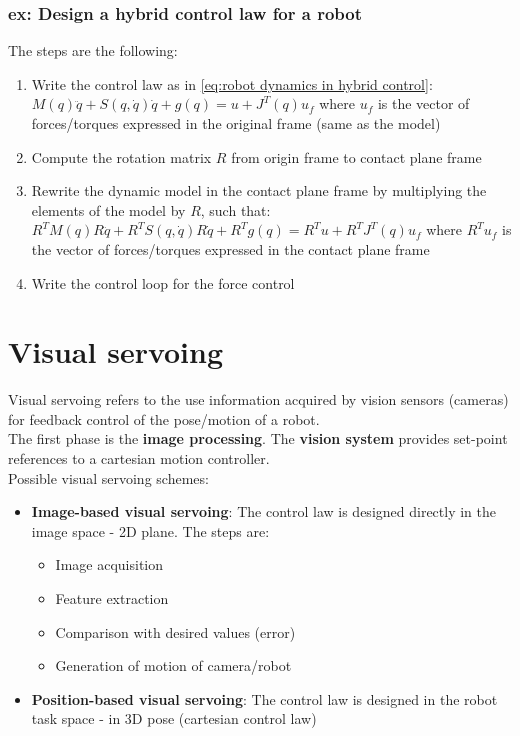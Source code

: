 \documentclass[a4paper,12pt]{article}
\begin{document}
\subsubsection{ex: Design a hybrid control law for a robot}
The steps are the following:
\begin{enumerate}
    \item Write the control law as in \ref{eq:robot dynamics in hybrid control}:
    $M(q)\ddot{q}+S(q,\dot{q})\dot{q}+g(q)=u+J^T(q)u_f$
    where $u_f$ is the vector of forces/torques expressed 
    in the original frame (same as the model)
    \item Compute the rotation matrix $R$ from origin frame to contact plane frame 
    \item Rewrite the dynamic model in the contact plane frame
    by multiplying the elements of the model by $R$, such that:
    $R^TM(q)R\ddot{q}+R^TS(q,\dot{q})R\dot{q}+R^Tg(q)=R^Tu + R^TJ^T(q)u_f$
    where $R^T u_f$ is the vector of forces/torques expressed in the contact plane frame
    \item Write the control loop for the force control
\end{enumerate}





\section{Visual servoing}
Visual servoing refers to the
use information acquired by vision sensors (cameras)
for feedback control of the pose/motion of a robot.\\
The first phase is the \textbf{image processing}.
The \textbf{vision system} provides set-point references to a cartesian 
motion controller.\\
Possible visual servoing schemes:
\begin{itemize}
    \item \textbf{Image-based visual servoing}: The control law
     is designed directly in the image space - 2D plane.
      The steps are: \begin{itemize}
        \item Image acquisition 
        \item Feature extraction
        \item Comparison with desired values (error)
        \item Generation of motion of camera/robot
      \end{itemize}
    \item \textbf{Position-based visual servoing}: The control 
    law is designed
    in the robot task space - in 3D pose (cartesian control law)
\end{itemize}
\end{document}
